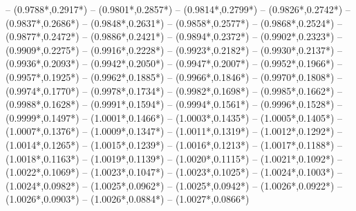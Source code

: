 {	-- ({0.9788*\dx},{0.2917*\dy})
	-- ({0.9801*\dx},{0.2857*\dy})
	-- ({0.9814*\dx},{0.2799*\dy})
	-- ({0.9826*\dx},{0.2742*\dy})
	-- ({0.9837*\dx},{0.2686*\dy})
	-- ({0.9848*\dx},{0.2631*\dy})
	-- ({0.9858*\dx},{0.2577*\dy})
	-- ({0.9868*\dx},{0.2524*\dy})
	-- ({0.9877*\dx},{0.2472*\dy})
	-- ({0.9886*\dx},{0.2421*\dy})
	-- ({0.9894*\dx},{0.2372*\dy})
	-- ({0.9902*\dx},{0.2323*\dy})
	-- ({0.9909*\dx},{0.2275*\dy})
	-- ({0.9916*\dx},{0.2228*\dy})
	-- ({0.9923*\dx},{0.2182*\dy})
	-- ({0.9930*\dx},{0.2137*\dy})
	-- ({0.9936*\dx},{0.2093*\dy})
	-- ({0.9942*\dx},{0.2050*\dy})
	-- ({0.9947*\dx},{0.2007*\dy})
	-- ({0.9952*\dx},{0.1966*\dy})
	-- ({0.9957*\dx},{0.1925*\dy})
	-- ({0.9962*\dx},{0.1885*\dy})
	-- ({0.9966*\dx},{0.1846*\dy})
	-- ({0.9970*\dx},{0.1808*\dy})
	-- ({0.9974*\dx},{0.1770*\dy})
	-- ({0.9978*\dx},{0.1734*\dy})
	-- ({0.9982*\dx},{0.1698*\dy})
	-- ({0.9985*\dx},{0.1662*\dy})
	-- ({0.9988*\dx},{0.1628*\dy})
	-- ({0.9991*\dx},{0.1594*\dy})
	-- ({0.9994*\dx},{0.1561*\dy})
	-- ({0.9996*\dx},{0.1528*\dy})
	-- ({0.9999*\dx},{0.1497*\dy})
	-- ({1.0001*\dx},{0.1466*\dy})
	-- ({1.0003*\dx},{0.1435*\dy})
	-- ({1.0005*\dx},{0.1405*\dy})
	-- ({1.0007*\dx},{0.1376*\dy})
	-- ({1.0009*\dx},{0.1347*\dy})
	-- ({1.0011*\dx},{0.1319*\dy})
	-- ({1.0012*\dx},{0.1292*\dy})
	-- ({1.0014*\dx},{0.1265*\dy})
	-- ({1.0015*\dx},{0.1239*\dy})
	-- ({1.0016*\dx},{0.1213*\dy})
	-- ({1.0017*\dx},{0.1188*\dy})
	-- ({1.0018*\dx},{0.1163*\dy})
	-- ({1.0019*\dx},{0.1139*\dy})
	-- ({1.0020*\dx},{0.1115*\dy})
	-- ({1.0021*\dx},{0.1092*\dy})
	-- ({1.0022*\dx},{0.1069*\dy})
	-- ({1.0023*\dx},{0.1047*\dy})
	-- ({1.0023*\dx},{0.1025*\dy})
	-- ({1.0024*\dx},{0.1003*\dy})
	-- ({1.0024*\dx},{0.0982*\dy})
	-- ({1.0025*\dx},{0.0962*\dy})
	-- ({1.0025*\dx},{0.0942*\dy})
	-- ({1.0026*\dx},{0.0922*\dy})
	-- ({1.0026*\dx},{0.0903*\dy})
	-- ({1.0026*\dx},{0.0884*\dy})
	-- ({1.0027*\dx},{0.0866*\dy})
}
